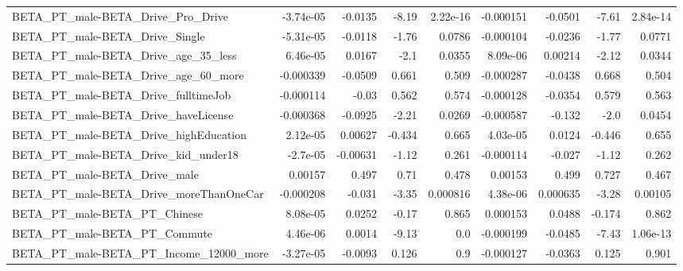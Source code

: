 \begin{tabular}{lrrrrrrrr}
BETA\_PT\_male-BETA\_Drive\_Pro\_Drive                  &   -3.74e-05 &      -0.0135 &     -8.19 & 2.22e-16 &  -0.000151 &     -0.0501 &        -7.61 &      2.84e-14 \\
BETA\_PT\_male-BETA\_Drive\_Single                     &   -5.31e-05 &      -0.0118 &     -1.76 &   0.0786 &  -0.000104 &     -0.0236 &        -1.77 &        0.0771 \\
BETA\_PT\_male-BETA\_Drive\_age\_35\_less                &    6.46e-05 &       0.0167 &      -2.1 &   0.0355 &   8.09e-06 &     0.00214 &        -2.12 &        0.0344 \\
BETA\_PT\_male-BETA\_Drive\_age\_60\_more                &   -0.000339 &      -0.0509 &     0.661 &    0.509 &  -0.000287 &     -0.0438 &        0.668 &         0.504 \\
BETA\_PT\_male-BETA\_Drive\_fulltimeJob                &   -0.000114 &        -0.03 &     0.562 &    0.574 &  -0.000128 &     -0.0354 &        0.579 &         0.563 \\
BETA\_PT\_male-BETA\_Drive\_haveLicense                &   -0.000368 &      -0.0925 &     -2.21 &   0.0269 &  -0.000587 &      -0.132 &         -2.0 &        0.0454 \\
BETA\_PT\_male-BETA\_Drive\_highEducation              &    2.12e-05 &      0.00627 &    -0.434 &    0.665 &   4.03e-05 &      0.0124 &       -0.446 &         0.655 \\
BETA\_PT\_male-BETA\_Drive\_kid\_under18                &    -2.7e-05 &     -0.00631 &     -1.12 &    0.261 &  -0.000114 &      -0.027 &        -1.12 &         0.262 \\
BETA\_PT\_male-BETA\_Drive\_male                       &     0.00157 &        0.497 &      0.71 &    0.478 &    0.00153 &       0.499 &        0.727 &         0.467 \\
BETA\_PT\_male-BETA\_Drive\_moreThanOneCar             &   -0.000208 &       -0.031 &     -3.35 & 0.000816 &   4.38e-06 &    0.000635 &        -3.28 &       0.00105 \\
BETA\_PT\_male-BETA\_PT\_Chinese                       &    8.08e-05 &       0.0252 &     -0.17 &    0.865 &   0.000153 &      0.0488 &       -0.174 &         0.862 \\
BETA\_PT\_male-BETA\_PT\_Commute                       &    4.46e-06 &       0.0014 &     -9.13 &      0.0 &  -0.000199 &     -0.0485 &        -7.43 &      1.06e-13 \\
BETA\_PT\_male-BETA\_PT\_Income\_12000\_more             &   -3.27e-05 &      -0.0093 &     0.126 &      0.9 &  -0.000127 &     -0.0363 &        0.125 &         0.901 \\

\end{tabular}
